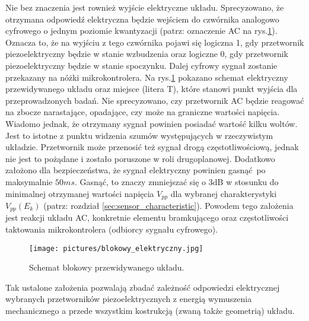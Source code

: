 \indent Nie bez znaczenia jest rownież wyjście elektryczne układu. Sprecyzowano, że 
otrzymana odpowiedź elektryczna będzie wejściem do czwórnika analogowo cyfrowego o jednym
poziomie kwantyzacji (patrz: oznaczenie AC na rys.\ref{fig:electrical_scheme}). 
Oznacza to, że na wyjściu z tego czwórnika pojawi się logiczna 1, gdy
przetwornik piezoelektryczny będzie w stanie wzbudzenia oraz logiczne 0, gdy przetwornik
piezoelektryczny będzie w stanie spoczynku. Dalej cyfrowy sygnał zostanie przekazany na 
nóżki mikrokontrolera. Na rys.\ref{fig:electrical_scheme} pokazano schemat elektryczny 
przewidywanego układu oraz miejsce (litera T), które stanowi punkt wyjścia dla 
przeprowadzonych badań. Nie sprecyzowano, czy przetwornik AC będzie reagować na zbocze
narastające, opadające, czy może na graniczne wartości napięcia. Wiadomo jednak, że
otrzymany sygnał powinien posiadać wartość kilku woltów. Jest to istotne z punktu widzenia
szumów występujących w rzeczywistym układzie. Przetwornik może przenosić też sygnał drogą
częstotliwościową, jednak nie jest to pożądane i zostało poruszone w roli drugoplanowej.
Dodatkowo założono dla bezpieczeństwa, że sygnał elektryczny powinien gasnąć po 
maksymalnie $50 ms$. Gasnąć, to znaczy zmniejszać się o 3dB w stosunku do minimalnej 
otrzymanej wartości napięcia $V_{pp}$ dla wybranej charakterystyki $V_{pp}(E_k)$ (patrz:
rozdział \ref{sec:sensor_characteristic}). Powodem tego założenia jest reakcji układu
AC, konkretnie elementu bramkującego oraz częstotliwości taktowania mikrokontrolera 
(odbiorcy sygnału cyfrowego).

\begin{figure}[htbp]
\centering
\texttt{[image: pictures/blokowy\_elektryczny.jpg]}
\caption{Schemat blokowy przewidywanego układu.}
\label{fig:electrical_scheme}
\end{figure}

\indent Tak ustalone założenia pozwalają zbadać zależność odpowiedzi 
elektrycznej wybranych przetworników piezoelektrycznych z energią wymuszenia mechanicznego 
a przede wszystkim kostrukcją (zwaną także geometrią) układu.